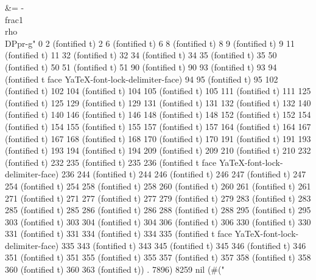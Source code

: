    &= -\\frac{1}{\\rho}\\DP{p}{r}-g" 0 2 (fontified t) 2 6 (fontified t) 6 8 (fontified t) 8 9 (fontified t) 9 11 (fontified t) 11 32 (fontified t) 32 34 (fontified t) 34 35 (fontified t) 35 50 (fontified t) 50 51 (fontified t) 51 90 (fontified t) 90 93 (fontified t) 93 94 (fontified t face YaTeX-font-lock-delimiter-face) 94 95 (fontified t) 95 102 (fontified t) 102 104 (fontified t) 104 105 (fontified t) 105 111 (fontified t) 111 125 (fontified t) 125 129 (fontified t) 129 131 (fontified t) 131 132 (fontified t) 132 140 (fontified t) 140 146 (fontified t) 146 148 (fontified t) 148 152 (fontified t) 152 154 (fontified t) 154 155 (fontified t) 155 157 (fontified t) 157 164 (fontified t) 164 167 (fontified t) 167 168 (fontified t) 168 170 (fontified t) 170 191 (fontified t) 191 193 (fontified t) 193 194 (fontified t) 194 209 (fontified t) 209 210 (fontified t) 210 232 (fontified t) 232 235 (fontified t) 235 236 (fontified t face YaTeX-font-lock-delimiter-face) 236 244 (fontified t) 244 246 (fontified t) 246 247 (fontified t) 247 254 (fontified t) 254 258 (fontified t) 258 260 (fontified t) 260 261 (fontified t) 261 271 (fontified t) 271 277 (fontified t) 277 279 (fontified t) 279 283 (fontified t) 283 285 (fontified t) 285 286 (fontified t) 286 288 (fontified t) 288 295 (fontified t) 295 303 (fontified t) 303 304 (fontified t) 304 306 (fontified t) 306 330 (fontified t) 330 331 (fontified t) 331 334 (fontified t) 334 335 (fontified t face YaTeX-font-lock-delimiter-face) 335 343 (fontified t) 343 345 (fontified t) 345 346 (fontified t) 346 351 (fontified t) 351 355 (fontified t) 355 357 (fontified t) 357 358 (fontified t) 358 360 (fontified t) 360 363 (fontified t)) . 7896) 8259 nil (#("%